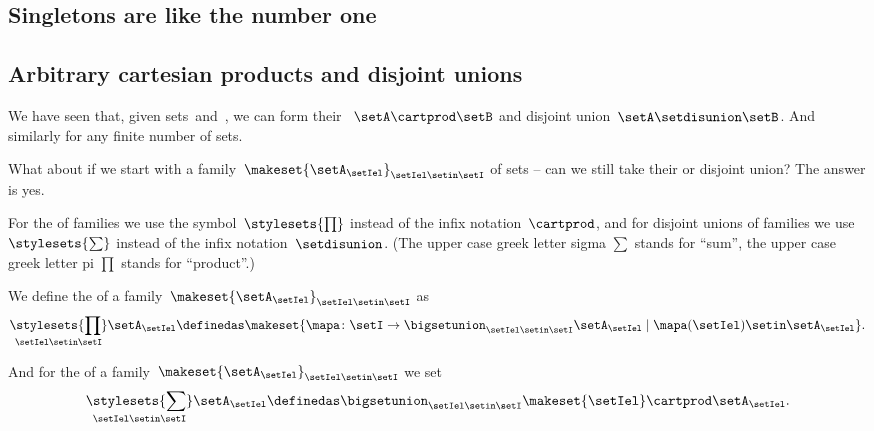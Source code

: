 
\subsection{Singletons are like the number one}


\subsection{Arbitrary cartesian products and disjoint unions}

We have seen that, given sets~\setA and~\setB, we can form their ~$\setA \cartprod \setB$ and disjoint union~$\setA \setdisunion \setB$.
And similarly for any finite number of sets.

What about if we start with a family~$\makeset{ \setA_\setIel }_{\setIel \setin\setI}$ of sets -- can we still take their  or disjoint union?
The answer is yes.

For the  of families we use the symbol~$\stylesets{\prod}$ instead of the infix notation~$\cartprod$, and for disjoint unions of families we use~$\stylesets{\sum}$ instead of the infix notation~$\setdisunion$.
(The upper case greek letter sigma $\sum$ stands for ``sum'', the upper case greek letter pi $\prod$ stands for ``product''.)

We define the  of a family~$\makeset{ \setA_{\setIel} }_{\setIel \setin\setI}$ as
\begin{equation}
    \underset{\setIel \setin\setI}{\stylesets{\prod}} \setA_{\setIel} \definedas \makeset{ \mapa \colon \setI \to \bigsetunion_{\setIel \setin\setI } \setA_{\setIel} \mid \mapa(\setIel) \setin\setA_{\setIel}}.
\end{equation}

And for the  of a family~$\makeset{ \setA_{\setIel} }_{\setIel \setin\setI}$ we set
\begin{equation}
    \underset{\setIel \setin\setI}{\stylesets{\sum}} \setA_{\setIel} \definedas \bigsetunion_{\setIel \setin\setI} \makeset{ \setIel } \cartprod \setA_{\setIel}.
\end{equation}

